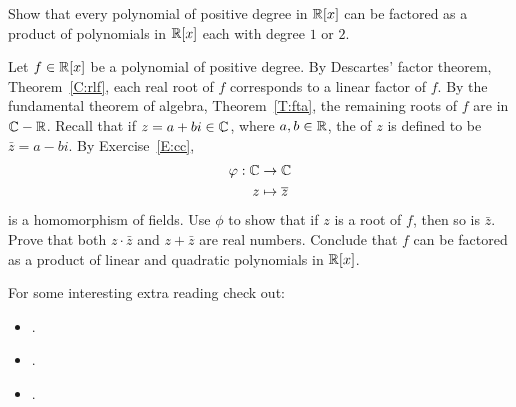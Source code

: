 \documentclass{ximera}
\begin{document}
\begin{corollary}\label{C:RQ} 
Show that every polynomial of positive degree in $\mathbb R[x]$ can be
factored as a product of polynomials in $\mathbb R[x]$ each with degree $1$
or $2$.
\begin{sketch}
  Let $f\in \mathbb R[x]$ be a polynomial of positive degree.  By Descartes'
  factor theorem, Theorem~\ref{C:rlf}, each real root of $f$
  corresponds to a linear factor of $f$. By the fundamental theorem of
  algebra, Theorem~\ref{T:fta}, the remaining roots of $f$ are in
  $\mathbb C-\mathbb R$.  Recall that if $z=a+bi\in\mathbb C$, where $a,b\in\mathbb R$, the
   of $z$ is defined to be $\bar{z} = a - bi$.
  By Exercise~\ref{E:cc},
  \begin{align*}
    \varphi:\mathbb C&\to\mathbb C\\
    z &\mapsto \overline{z}
  \end{align*}
  is a homomorphism of fields.  Use $\phi$ to show that if $z$ is a
  root of $f$, then so is $\bar{z}$.  Prove that both $z\cdot \bar{z}$
  and $z+\bar{z}$ are real numbers.  Conclude that $f$ can be factored
  as a product of linear and quadratic polynomials in $\mathbb R[x]$.
\end{sketch}
\end{corollary}




For some interesting extra reading check out:
\begin{itemize}
\item {}.
\item {}.
\item {}.
\end{itemize}
\end{document}

